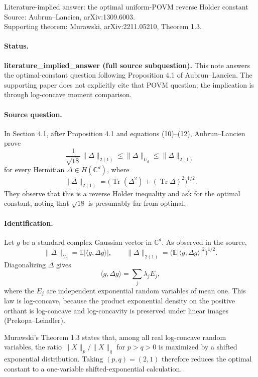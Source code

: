 \documentclass[11pt]{article}
\begin{document}
\begin{center}
{\Large Literature-implied answer: the optimal uniform-POVM reverse Holder constant}\\[0.5em]
Source: Aubrun--Lancien, arXiv:1309.6003.\\
Supporting theorem: Murawski, arXiv:2211.05210, Theorem 1.3.
\end{center}

\paragraph{Status.}
\textbf{literature\_implied\_answer (full source subquestion).}
This note answers the optimal-constant question following Proposition 4.1 of
Aubrun--Lancien. The supporting paper does not explicitly cite that POVM
question; the implication is through log-concave moment comparison.

\paragraph{Source question.}
In Section 4.1, after Proposition 4.1 and equations (10)--(12),
Aubrun--Lancien prove
\[
  \frac{1}{\sqrt{18}}\|\Delta\|_{2(1)}
  \leq \|\Delta\|_{U_d}
  \leq \|\Delta\|_{2(1)}
\]
for every Hermitian $\Delta\in H(\mathbb C^d)$, where
\[
  \|\Delta\|_{2(1)}
  =\big(\operatorname{Tr}(\Delta^2)+(\operatorname{Tr}\Delta)^2\big)^{1/2}.
\]
They observe that this is a reverse Holder inequality and ask for the optimal
constant, noting that $\sqrt{18}$ is presumably far from optimal.

\paragraph{Identification.}
Let $g$ be a standard complex Gaussian vector in $\mathbb C^d$. As observed in
the source,
\[
  \|\Delta\|_{U_d}=\mathbb E |\langle g,\Delta g\rangle|,
  \qquad
  \|\Delta\|_{2(1)}
  =\big(\mathbb E|\langle g,\Delta g\rangle|^2\big)^{1/2}.
\]
Diagonalizing $\Delta$ gives
\[
  \langle g,\Delta g\rangle=\sum_j \lambda_j E_j,
\]
where the $E_j$ are independent exponential random variables of mean one. This
law is log-concave, because the product exponential density on the positive
orthant is log-concave and log-concavity is preserved under linear images
(Prekopa--Leindler).

Murawski's Theorem 1.3 states that, among all real log-concave random variables,
the ratio $\|X\|_p/\|X\|_q$ for $p>q>0$ is maximized by a shifted exponential
distribution. Taking $(p,q)=(2,1)$ therefore reduces the optimal constant to a
one-variable shifted-exponential calculation.
\end{document}
